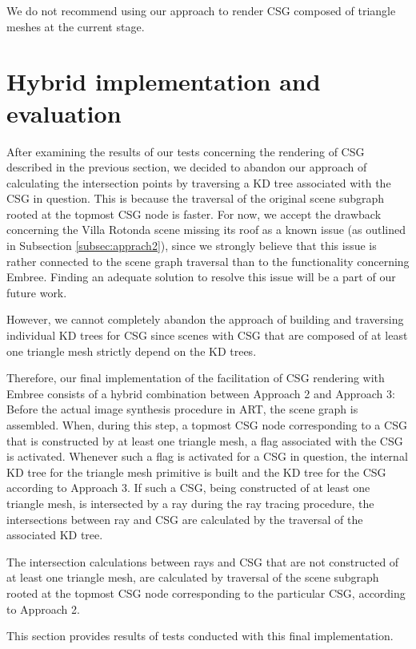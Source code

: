 We do not recommend using our approach to render CSG composed of triangle meshes at the current stage. 


\section{Hybrid implementation and evaluation}
\label{sec:result_normal}

After examining the results of our tests concerning the rendering of CSG described in the previous section, we decided to abandon our approach of calculating the intersection points by traversing a KD tree associated with the CSG in question. This is because the traversal of the original scene subgraph rooted at the topmost CSG node is faster. For now, we accept the drawback concerning the Villa Rotonda scene missing its roof as a known issue (as outlined in Subsection \ref{subsec:apprach2}), since we strongly believe that this issue is rather connected to the scene graph traversal than to the functionality concerning Embree. Finding an adequate solution to resolve this issue will be a part of our future work.

However, we cannot completely abandon the approach of building and traversing individual KD trees for CSG since scenes with CSG that are composed of at least one triangle mesh strictly depend on the KD trees.

Therefore, our final implementation of the facilitation of CSG rendering with Embree consists of a hybrid combination between Approach 2 and Approach 3: Before the actual image synthesis procedure in ART, the scene graph is assembled. When, during this step, a topmost CSG node corresponding to a CSG that is constructed by at least one triangle mesh, a flag associated with the CSG is activated. Whenever such a flag is activated for a CSG in question, the internal KD tree for the triangle mesh primitive is built and the KD tree for the CSG according to Approach 3. If such a CSG, being constructed of at least one triangle mesh, is intersected by a ray during the ray tracing procedure, the intersections between ray and CSG are calculated by the traversal of the associated KD tree.

The intersection calculations between rays and CSG that are not constructed of at least one triangle mesh, are calculated by traversal of the scene subgraph rooted at the topmost CSG node corresponding to the particular CSG, according to Approach 2.

This section provides results of tests conducted with this final implementation.
\\

